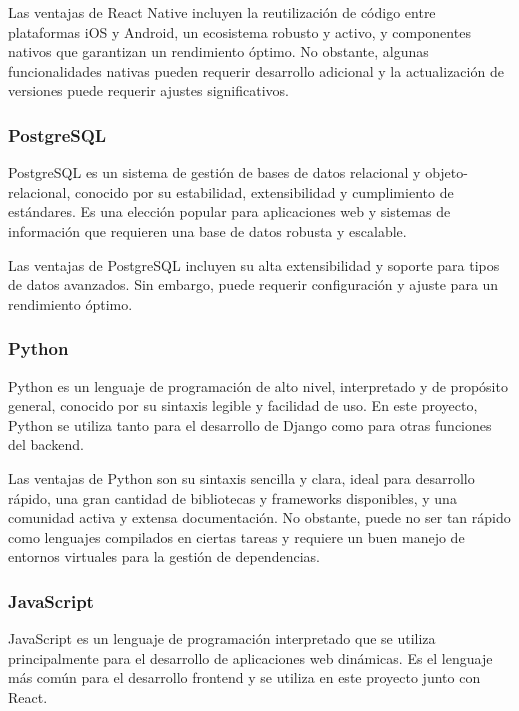 Las ventajas de React Native incluyen la reutilización de código entre plataformas iOS y Android, un ecosistema robusto y activo, y componentes nativos que garantizan un rendimiento óptimo. No obstante, algunas funcionalidades nativas pueden requerir desarrollo adicional y la actualización de versiones puede requerir ajustes significativos.

\subsubsection{PostgreSQL}

PostgreSQL \cite{PostgreSQL} es un sistema de gestión de bases de datos relacional y objeto-relacional, conocido por su estabilidad, extensibilidad y cumplimiento de estándares. Es una elección popular para aplicaciones web y sistemas de información que requieren una base de datos robusta y escalable.

Las ventajas de PostgreSQL incluyen su alta extensibilidad y soporte para tipos de datos avanzados. Sin embargo, puede requerir configuración y ajuste para un rendimiento óptimo.

\subsubsection{Python}

Python es un lenguaje de programación de alto nivel, interpretado y de propósito general, conocido por su sintaxis legible y facilidad de uso. En este proyecto, Python se utiliza tanto para el desarrollo de Django como para otras funciones del backend\cite{Python}.

Las ventajas de Python son su sintaxis sencilla y clara, ideal para desarrollo rápido, una gran cantidad de bibliotecas y frameworks disponibles, y una comunidad activa y extensa documentación. No obstante, puede no ser tan rápido como lenguajes compilados en ciertas tareas y requiere un buen manejo de entornos virtuales para la gestión de dependencias.

\subsubsection{JavaScript}

JavaScript es un lenguaje de programación interpretado que se utiliza principalmente para el desarrollo de aplicaciones web dinámicas. Es el lenguaje más común para el desarrollo frontend y se utiliza en este proyecto junto con React\cite{JavaScript}.

